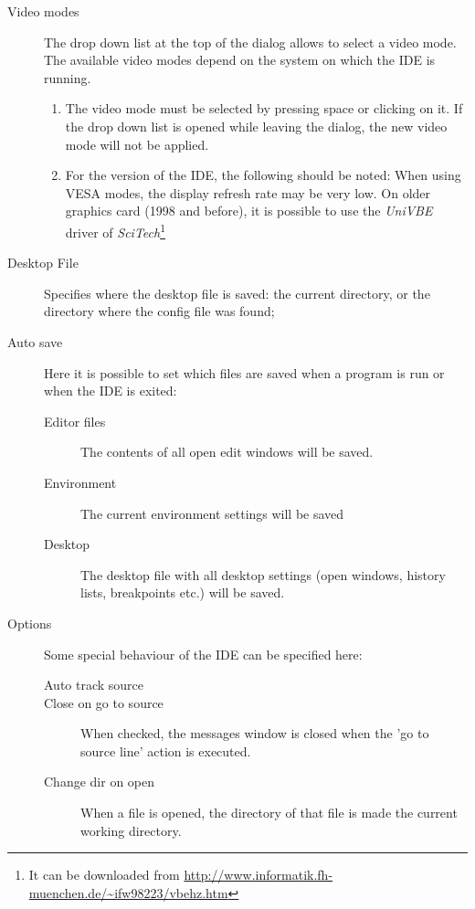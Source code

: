 \begin{description}
\item[Video modes]
The drop down list at the top of the dialog allows to select a video mode.
The available video modes depend on the system on which the IDE
is running. 
\begin{remark}
\begin{enumerate}
\item The video mode must be selected by pressing space or clicking
on it. If the drop down list is opened while leaving the dialog,
the new video mode will not be applied.
\item For the \dos version of the IDE, the following should be noted:
When using VESA modes, the display refresh rate may be very low. 
On older graphics card (1998 and before), it is possible to use the
{\em UniVBE} driver of {\em SciTech}\footnote{It can be downloaded from
\href{http://www.informatik.fh-muenchen.de/~ifw98223/vbehz.htm}
{http://www.informatik.fh-muenchen.de/\~{}ifw98223/vbehz.htm}}
\end{enumerate}
\end{remark}
\item[Desktop File]
Specifies where the desktop file is saved: the current directory, or the
directory where the config file was found;
\item[Auto save]
Here it is possible to set which files are saved when a program is run or
when the IDE is exited:
\begin{description}
\item[Editor files] The contents of all open edit windows will be saved.
\item[Environment] The current environment settings will be saved
\item[Desktop] The desktop file with all desktop settings (open windows,
history lists, breakpoints etc.) will be saved.
\end{description}
\item[Options] 
Some special behaviour of the IDE can be specified here:
\begin{description}
\item[Auto track source]
\item[Close on go to source] When checked, the messages window is closed 
when the 'go to source line' action is executed.
\item[Change dir on open] When a file is opened, the directory of that file
is made the current working directory.
\end{description}
\end{description}
%
%
